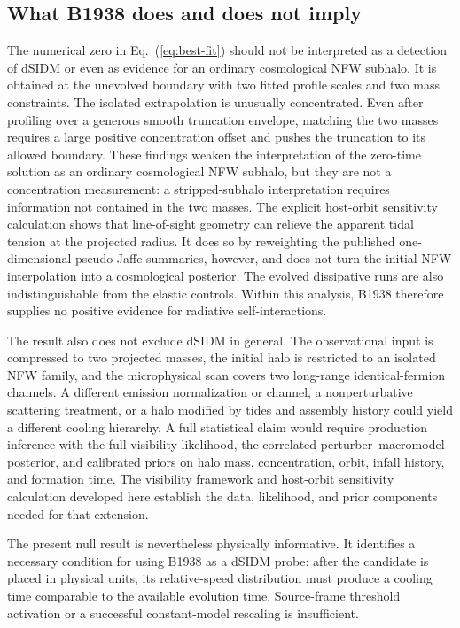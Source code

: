 \documentclass[12pt]{iopart}
\begin{document}
\subsection{What B1938 does and does not imply}

The numerical zero in Eq.~(\ref{eq:best-fit}) should not be interpreted as a
detection of dSIDM or even as evidence for an ordinary cosmological NFW
subhalo.  It is obtained at the unevolved boundary with two fitted profile
scales and two mass constraints.  The isolated extrapolation is unusually
concentrated.  Even after profiling over a generous smooth truncation envelope,
matching the two masses requires a large positive concentration offset and
pushes the truncation to its allowed boundary.  These findings weaken the
interpretation of the zero-time solution as an ordinary cosmological NFW
subhalo, but they are not a concentration measurement: a stripped-subhalo
interpretation requires information not contained in the two masses.  The
explicit host-orbit sensitivity calculation shows that line-of-sight geometry
can relieve the apparent tidal tension at the projected radius.  It does so by
reweighting the published one-dimensional pseudo-Jaffe summaries, however, and does
not turn the initial NFW interpolation into a cosmological posterior.  The
evolved dissipative runs are also indistinguishable from the elastic controls.
Within this analysis, B1938 therefore supplies no positive evidence for
radiative self-interactions.

The result also does not exclude dSIDM in general.  The observational input is
compressed to two projected masses, the initial halo is restricted to an
isolated NFW family, and the microphysical scan covers two long-range
identical-fermion channels.  A different emission normalization or channel, a
nonperturbative scattering treatment, or a halo modified by tides and assembly
history could yield a different cooling hierarchy.  A full statistical claim
would require production inference with the full visibility likelihood, the
correlated perturber--macromodel posterior, and calibrated priors on halo mass,
concentration, orbit, infall history, and formation time.  The visibility
framework and host-orbit sensitivity calculation developed here establish the
data, likelihood, and prior components needed for that extension.

The present null result is nevertheless physically informative.  It identifies
a necessary condition for using B1938 as a dSIDM probe: after the candidate is
placed in physical units, its relative-speed distribution must produce a
cooling time comparable to the available evolution time.  Source-frame
threshold activation or a successful constant-model rescaling is insufficient.
\end{document}
